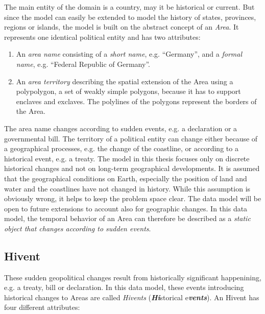 The main entity of the domain is a country, may it be historical or current. But since the model can easily be extended to model the history of states, provinces, regions or islands, the model is built on the abstract concept of an \emph{Area}. It represents one identical political entity and has two attributes:

\begin{enumerate}
  \item An \emph{area name} consisting of a \emph{short name}, e.g. ``Germany'', and a \emph{formal name}, e.g. ``Federal Republic of Germany''.
  \item An \emph{area territory} describing the spatial extension of the Area using a polypolygon, a set of weakly simple polygons, because it has to support enclaves and exclaves. The polylines of the polygons represent the borders of the Area.
\end{enumerate}

The area name changes according to sudden events, e.g. a declaration or a governmental bill. The territory of a political entity can change either because of a geographical processes, e.g. the change of the coastline, or according to a historical event, e.g. a treaty. The model in this thesis focuses only on discrete historical changes and not on long-term geographical developments. It is assumed that the geographical conditions on Earth, especially the position of land and water and the coastlines have not changed in history. While this assumption is obviously wrong, it helps to keep the problem space clear. The data model will be open to future extensions to account also for geographic changes. In this data model, the temporal behavior of an Area can therefore be described as a \emph{static object that changes according to sudden events}.



\subsection{Hivent} %
\label{sub:hivent}

These sudden geopolitical changes result from historically significant happenining, e.g. a treaty, bill or declaration. In this data model, these events introducing historical changes to Areas are called \emph{Hivents} (\emph{\textbf{Hi}}storical e\emph{\textbf{vents}}). An Hivent has four different attributes:

